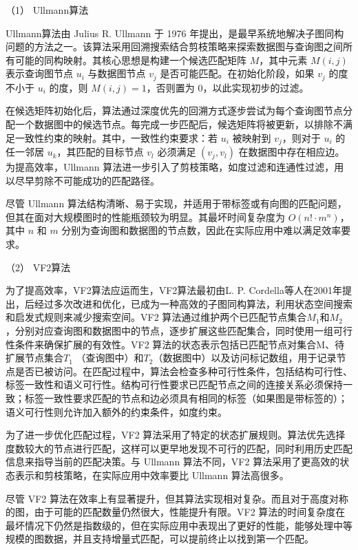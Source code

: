 （1） Ullmann算法

Ullmann算法\cite{sm-ullmann-DBLP:journals/jacm/Ullmann76}由 Julius R. Ullmann 于 1976 年提出，是最早系统地解决子图同构问题的方法之一。该算法采用回溯搜索结合剪枝策略来探索数据图与查询图之间所有可能的同构映射。其核心思想是构建一个候选匹配矩阵 $M$，其中元素 $M(i,j)$ 表示查询图节点 $u_i$ 与数据图节点 $v_j$ 是否可能匹配。在初始化阶段，如果 $v_j$ 的度不小于 $u_i$ 的度，则 $M(i,j) = 1$，否则置为 0，以此实现初步的过滤。

在候选矩阵初始化后，算法通过深度优先的回溯方式逐步尝试为每个查询图节点分配一个数据图中的候选节点。每完成一步匹配后，候选矩阵将被更新，以排除不满足一致性约束的映射。其中，一致性约束要求：若 $u_i$ 被映射到 $v_j$，则对于 $u_i$ 的任一邻居 $u_k$，其匹配的目标节点 $v_l$ 必须满足 $(v_j, v_l)$ 在数据图中存在相应边。为提高效率，Ullmann 算法进一步引入了剪枝策略，如度过滤和连通性过滤，用以尽早剪除不可能成功的匹配路径。

尽管 Ullmann 算法结构清晰、易于实现，并适用于带标签或有向图的匹配问题，但其在面对大规模图时的性能瓶颈较为明显。其最坏时间复杂度为 $O(n! \cdot m^n)$，其中 $n$ 和 $m$ 分别为查询图和数据图的节点数，因此在实际应用中难以满足效率要求。

（2） VF2算法

为了提高效率，VF2算法应运而生，VF2算法最初由L. P. Cordella等人在2001年提出\cite{sm-vf2-2004}，后经过多次改进和优化，已成为一种高效的子图同构算法，利用状态空间搜索和启发式规则来减少搜索空间。VF2 算法通过维护两个已匹配节点集合$M_1$和$M_2$ ，分别对应查询图和数据图中的节点，逐步扩展这些匹配集合，同时使用一组可行性条件来确保扩展的有效性。VF2 算法的状态表示包括已匹配节点对集合M、待扩展节点集合$T_1$ （查询图中）和$T_2$（数据图中）以及访问标记数组，用于记录节点是否已被访问。在匹配过程中，算法会检查多种可行性条件，包括结构可行性、标签一致性和语义可行性。结构可行性要求已匹配节点之间的连接关系必须保持一致；标签一致性要求匹配的节点和边必须具有相同的标签（如果图是带标签的）；语义可行性则允许加入额外的约束条件，如度约束。


为了进一步优化匹配过程，VF2 算法采用了特定的状态扩展规则。算法优先选择度数较大的节点进行匹配，这样可以更早地发现不可行的匹配，同时利用历史匹配信息来指导当前的匹配决策。与 Ullmann 算法不同，VF2 算法采用了更高效的状态表示和剪枝策略，在实际应用中效率要比 Ullmann 算法高很多。

尽管 VF2 算法在效率上有显著提升，但其算法实现相对复杂。而且对于高度对称的图，由于可能的匹配数量仍然很大，性能提升有限。VF2 算法的时间复杂度在最坏情况下仍然是指数级的，但在实际应用中表现出了更好的性能，能够处理中等规模的图数据，并且支持增量式匹配，可以提前终止以找到第一个匹配。

